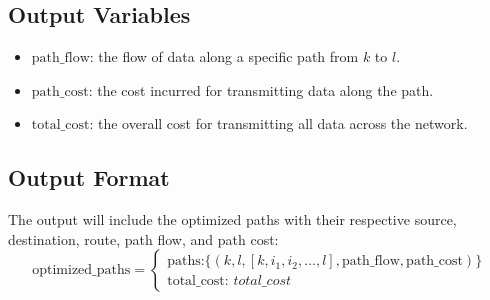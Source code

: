\documentclass{article}
\begin{document}
\subsection*{Output Variables}
\begin{itemize}
    \item \( \text{path\_flow} \): the flow of data along a specific path from \( k \) to \( l \).
    \item \( \text{path\_cost} \): the cost incurred for transmitting data along the path.
    \item \( \text{total\_cost} \): the overall cost for transmitting all data across the network.
\end{itemize}

\subsection*{Output Format}
The output will include the optimized paths with their respective source, destination, route, path flow, and path cost:
\[
\text{optimized\_paths} = 
\begin{cases}
\text{paths:} \{(k, l, [k, i_1, i_2, \ldots, l], \text{path\_flow}, \text{path\_cost})\} \\
\text{total\_cost: } total\_cost
\end{cases}
\]
\end{document}
